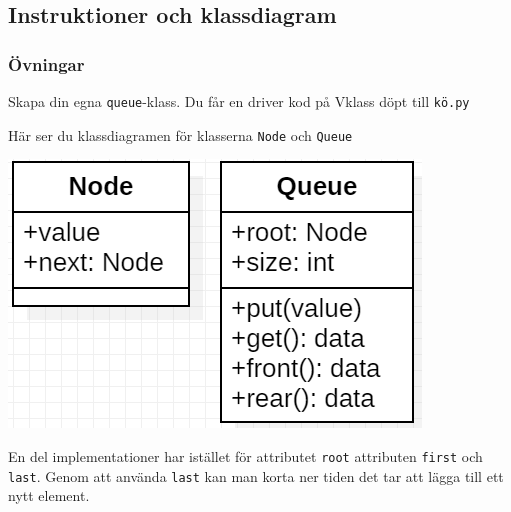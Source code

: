 \documentclass[aspectratio=169]{beamer}
\begin{document}
\subsection{Instruktioner och klassdiagram}

\begin{frame}[fragile]
	\frametitle{Övningar}
	
	Skapa din egna \texttt{queue}-klass. Du får en driver kod på Vklass döpt till \texttt{kö.py}
	
	Här ser du klassdiagramen för klasserna \texttt{Node} och \texttt{Queue}
	
	\begin{center}
		\includegraphics[width=.4\textwidth]{kö.png}
	\end{center}
	
	En del implementationer har istället för attributet \texttt{root} attributen \texttt{first} och \texttt{last}. Genom att använda \texttt{last} kan man korta ner tiden det tar att lägga till ett nytt element.
	
\end{frame}
\end{document}
